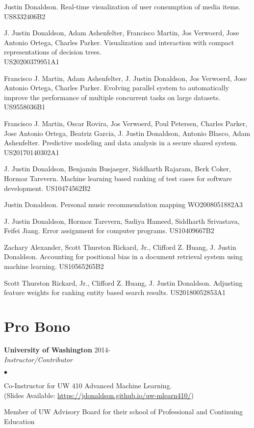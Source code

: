 \documentclass[margin,line]{res}
\newenvironment{list2}{
  \begin{list}{$\bullet$}{%
      \setlength{\itemsep}{0in}
      \setlength{\parsep}{0in} \setlength{\parskip}{0in}
      \setlength{\topsep}{0in} \setlength{\partopsep}{0in} 
      \setlength{\leftmargin}{0.2in}}}{\end{list}}
\begin{document}
\begin{resume}
Justin Donaldson. Real-time visualization of user consumption of media items. US8332406B2

J. Justin Donaldson, Adam Ashenfelter, Francisco Martin, Jos Verwoerd, Jose Antonio Ortega, Charles Parker. Visualization and interaction with compact representations of decision trees. \\US20200379951A1

Francisco J. Martin, Adam Ashenfelter, J. Justin Donaldson, Jos Verwoerd, Jose Antonio Ortega, Charles Parker.  Evolving parallel system to automatically improve the performance of multiple concurrent tasks on large datasets. US9558036B1

Francisco J. Martin, Oscar Rovira,  Jos Verwoerd, Poul Petersen, Charles Parker, Jose Antonio Ortega, Beatriz Garcia, J. Justin Donaldson, Antonio Blasco, Adam Ashenfelter. Predictive modeling and data analysis in a secure shared system. US20170140302A1

J. Justin Donaldson, Benjamin Busjaeger, Siddharth Rajaram, Berk Coker, Hormoz Tarevern. Machine learning based ranking of test cases for software development. US10474562B2

Justin Donaldson. Personal music recommendation mapping WO2008051882A3

J. Justin Donaldson, Hormoz Tarevern, Sadiya Hameed, Siddharth Srivastava, Feifei Jiang. Error assignment for computer programs. US10409667B2

Zachary Alexander, Scott Thurston Rickard, Jr., Clifford Z. Huang, J. Justin Donaldson. Accounting for positional bias in a document retrieval system using machine learning. US10565265B2

Scott Thurston Rickard, Jr., Clifford Z. Huang, J. Justin Donaldson. Adjusting feature weights for ranking entity based search results. US20180052853A1


\section{\sc Pro Bono}

{\bf University of Washington} \hfill 2014- \\
{\em Instructor/Contributor}
\begin{list2}
  \item Co-Instructor for UW 410 Advanced Machine Learning.\\ (Slides Available: \url{https://jdonaldson.github.io/uw-mlearn410/})
  \item Member of UW Advisory Board for their school of Professional and Continuing Education
\end{list2}


\end{resume}
\end{document}
